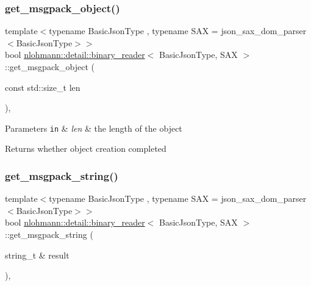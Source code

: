 \subsubsection{\texorpdfstring{get\+\_\+msgpack\+\_\+object()}{get\_msgpack\_object()}}
{\footnotesize\ttfamily template$<$typename Basic\+Json\+Type , typename S\+AX  = json\+\_\+sax\+\_\+dom\+\_\+parser$<$\+Basic\+Json\+Type$>$$>$ \\
bool \mbox{\hyperlink{classnlohmann_1_1detail_1_1binary__reader}{nlohmann\+::detail\+::binary\+\_\+reader}}$<$ Basic\+Json\+Type, S\+AX $>$\+::get\+\_\+msgpack\+\_\+object (\begin{DoxyParamCaption}\item[{const std\+::size\+\_\+t}]{len }\end{DoxyParamCaption})\hspace{0.3cm}{\ttfamily [inline]}, {\ttfamily [private]}}


\begin{DoxyParams}[1]{Parameters}
\mbox{\tt in}  & {\em len} & the length of the object \\
\hline
\end{DoxyParams}
\begin{DoxyReturn}{Returns}
whether object creation completed 
\end{DoxyReturn}
\mbox{\label{classnlohmann_1_1detail_1_1binary__reader_a5526ed98ca4c436cbae6f8a77ea207b8}} 
\subsubsection{\texorpdfstring{get\+\_\+msgpack\+\_\+string()}{get\_msgpack\_string()}}
{\footnotesize\ttfamily template$<$typename Basic\+Json\+Type , typename S\+AX  = json\+\_\+sax\+\_\+dom\+\_\+parser$<$\+Basic\+Json\+Type$>$$>$ \\
bool \mbox{\hyperlink{classnlohmann_1_1detail_1_1binary__reader}{nlohmann\+::detail\+::binary\+\_\+reader}}$<$ Basic\+Json\+Type, S\+AX $>$\+::get\+\_\+msgpack\+\_\+string (\begin{DoxyParamCaption}\item[{string\+\_\+t \&}]{result }\end{DoxyParamCaption})\hspace{0.3cm}{\ttfamily [inline]}, {\ttfamily [private]}}



